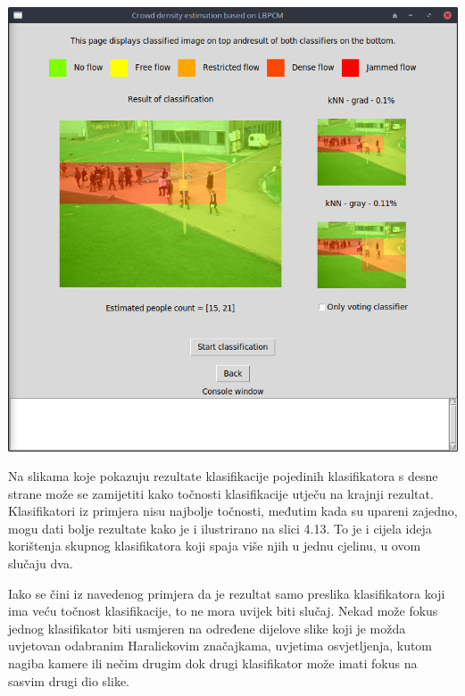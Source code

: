 \documentclass[times, utf8, zavrsni]{fer}
\begin{document}
\bigbreak

\begin{minipage}{\linewidth}
\centering
\includegraphics[scale=0.38]{img/cl5.png}
\end{minipage}

\bigbreak

Na slikama koje pokazuju rezultate klasifikacije pojedinih klasifikatora s 
desne strane može se zamijetiti kako točnosti klasifikacije utječu na
krajnji rezultat. Klasifikatori iz primjera nisu najbolje točnosti, 
međutim kada su upareni zajedno, mogu dati bolje rezultate kako je 
i ilustrirano na slici 4.13. To je i cijela ideja korištenja skupnog
klasifikatora koji spaja više njih u jednu cjelinu, u ovom slučaju
dva. 

\bigbreak

Iako se čini iz navedenog primjera da je rezultat samo preslika 
klasifikatora koji ima veću točnost klasifikacije, to ne mora uvijek 
biti slučaj. Nekad može fokus jednog klasifikator biti usmjeren 
na određene dijelove slike koji je možda uvjetovan odabranim 
Haralickovim značajkama, uvjetima osvjetljenja, kutom nagiba kamere ili 
nečim drugim dok drugi klasifikator može imati fokus na sasvim drugi 
dio slike. 

\bigbreak
\end{document}
